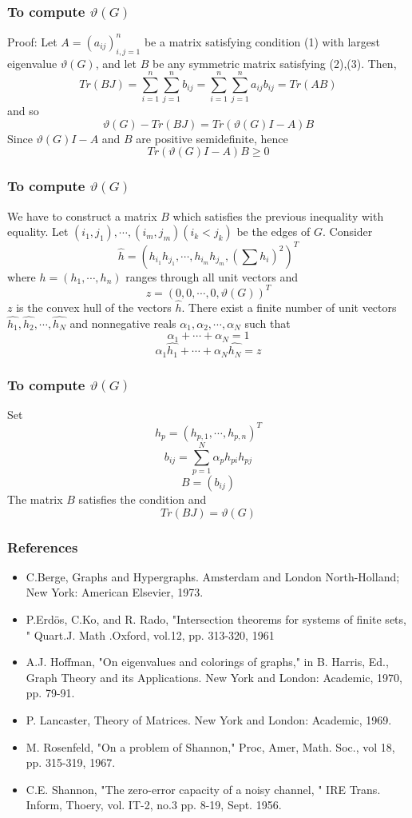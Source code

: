 \documentclass{beamer}
\begin{document}
\begin{frame}
\frametitle{To compute $\vartheta (G)$}
Proof: Let $A=(a_{ij})_{i,j=1}^n$ be a matrix satisfying condition (1) with largest eigenvalue $\vartheta (G)$, and let $B$ be any symmetric matrix satisfying (2),(3). Then,
\[
Tr (BJ)=\sum_{i=1}^{n}\sum_{j=1}^{n}b_{ij}=\sum_{i=1}^{n}\sum_{j=1}^{n}{a_{ij}b_{ij}}= Tr (AB)
\]
and so 
\[
\vartheta (G) -Tr(BJ) = Tr(\vartheta (G)I-A)B
\]
Since $\vartheta (G) I-A$ and $B$ are positive semidefinite, hence
\[
Tr(\vartheta (G)I-A)B \geq 0
\]

\end{frame}

\begin{frame}
\frametitle{To compute $\vartheta (G)$}
We have to construct a matrix $B$ which satisfies the previous inequality with equality. Let $(i_1,j_1),\cdots,(i_m,j_m)(i_k < j_k)$ be the edges of $G$. Consider
\[
\hat{h}=(h_{i_1}h_{j_1},\cdots,h_{i_m}h_{j_m},(\sum{h_i})^2)^T
\]
where $h=(h_1,\cdots, h_n)$ ranges through all unit vectors and 
\[
z=(0,0,\cdots,0,\vartheta (G))^T
\]
$z$ is the convex hull of the vectors $\hat{h}$.
There exist a finite number of unit vectors $\hat{h_1}, \hat{h_2}, \cdots, \hat{h_N}$ and nonnegative reals $\alpha_1, \alpha_2, \cdots, \alpha_N$ such that
\[
\alpha_1+\cdots+\alpha_N=1
\]
\[
\alpha_1 \hat{h_1}+\cdots+\alpha_N \hat{h_N}=z
\]

\end{frame}

\begin{frame}
\frametitle{To compute $\vartheta (G)$}
Set 
\[
h_p=(h_{p,1},\cdots,h_{p,n})^T
\]
\[
b_{ij}=\sum_{p=1}^{N}\alpha_p h_{pi} h_{pj}
\]
\[
B=(b_{ij})
\]
The matrix $B$ satisfies the condition and
\[
Tr(BJ)=\vartheta (G)
\]

\end{frame}

\begin{frame}
\frametitle{References}

\begin{itemize}
\item C.Berge, Graphs and Hypergraphs. Amsterdam and London North-Holland; New York: American Elsevier, 1973.
\item P.Erd\"os, C.Ko, and R. Rado, "Intersection theorems for systems of finite sets, " Quart.J. Math .Oxford, vol.12, pp. 313-320, 1961
\item A.J. Hoffman, "On eigenvalues and colorings of graphs," in B. Harris, Ed., Graph Theory and its Applications. New York and London: Academic, 1970, pp. 79-91.
\item P. Lancaster, Theory of Matrices. New York and London: Academic, 1969.
\item M. Rosenfeld, "On a problem of Shannon," Proc, Amer, Math. Soc., vol 18, pp. 315-319, 1967.
\item C.E. Shannon, "The zero-error capacity of a noisy channel, " IRE Trans. Inform, Thoery, vol. IT-2, no.3 pp. 8-19, Sept. 1956.
\end{itemize}


\end{frame}
\end{document}
